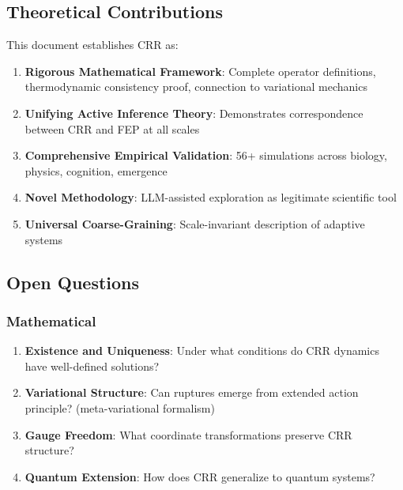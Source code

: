 \documentclass[11pt,a4paper]{article}
\theoremstyle{definition}
\theoremstyle{remark}
\begin{document}
\subsection{Theoretical Contributions}

This document establishes CRR as:

\begin{enumerate}
\item \textbf{Rigorous Mathematical Framework}: Complete operator definitions, thermodynamic consistency proof, connection to variational mechanics

\item \textbf{Unifying Active Inference Theory}: Demonstrates correspondence between CRR and FEP at all scales

\item \textbf{Comprehensive Empirical Validation}: 56+ simulations across biology, physics, cognition, emergence

\item \textbf{Novel Methodology}: LLM-assisted exploration as legitimate scientific tool

\item \textbf{Universal Coarse-Graining}: Scale-invariant description of adaptive systems
\end{enumerate}

\subsection{Open Questions}

\subsubsection{Mathematical}

\begin{enumerate}
\item \textbf{Existence and Uniqueness}: Under what conditions do CRR dynamics have well-defined solutions?

\item \textbf{Variational Structure}: Can ruptures emerge from extended action principle? (meta-variational formalism)

\item \textbf{Gauge Freedom}: What coordinate transformations preserve CRR structure?

\item \textbf{Quantum Extension}: How does CRR generalize to quantum systems?
\end{enumerate}
\end{document}

